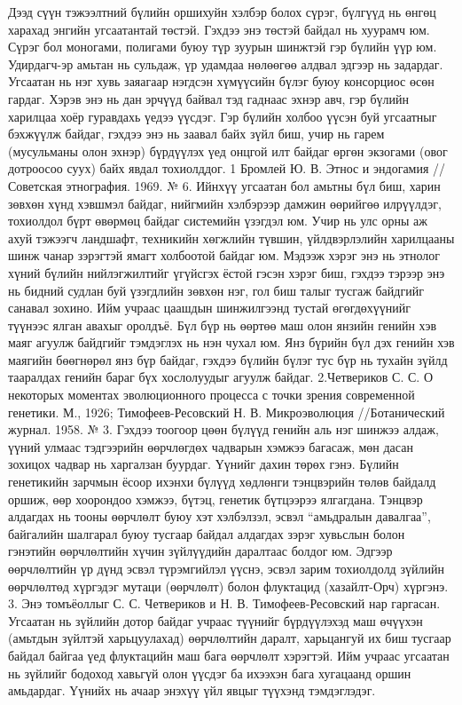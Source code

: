 Дээд сүүн тэжээлтний бүлийн оршихуйн хэлбэр болох сүрэг, бүлгүүд нь өнгөц харахад энгийн угсаатантай төстэй. Гэхдээ энэ төстэй байдал нь хуурамч юм. Сүрэг бол моногами, полигами буюу түр зуурын шинжтэй гэр бүлийн үүр юм. Удирдагч-эр амьтан нь сульдаж, үр удамдаа нөлөөгөө алдвал эдгээр нь задардаг. Угсаатан нь нэг хувь заяагаар нэгдсэн хүмүүсийн бүлэг буюу консорциос өсөн гардаг. Хэрэв энэ нь дан эрчүүд байвал тэд гаднаас эхнэр авч, гэр бүлийн харилцаа хоёр гуравдахь үедээ үүсдэг. Гэр бүлийн холбоо үүсэн буй угсаатныг бэхжүүлж байдаг, гэхдээ энэ нь заавал байх зүйл биш, учир нь гарем (мусульманы олон эхнэр) бүрдүүлэх үед онцгой илт байдаг өргөн экзогами (овог дотроосоо суух) байх явдал тохиолддог. 1 Бромлей Ю. В. Этнос и эндогамия //Советская этнография. 1969. № 6.
Ийнхүү угсаатан бол амьтны бүл биш, харин зөвхөн хүнд хэвшмэл байдаг, нийгмийн хэлбэрээр дамжин өөрийгөө илрүүлдэг, тохиолдол бүрт өвөрмөц байдаг системийн үзэгдэл юм. Учир нь улс орны аж ахуй тэжээгч ландшафт, техникийн хөгжлийн түвшин, үйлдвэрлэлийн харилцааны шинж чанар зэрэгтэй ямагт холбоотой байдаг юм. Мэдээж хэрэг энэ нь этнолог хүний бүлийн нийлэгжилтийг үгүйсгэх ёстой гэсэн хэрэг биш, гэхдээ тэрээр энэ нь бидний судлан буй үзэгдлийн зөвхөн нэг, гол биш талыг тусгаж байдгийг санавал зохино. Ийм учраас цаашдын шинжилгээнд тустай өгөгдөхүүнийг түүнээс ялган авахыг оролдъё.
Бүл бүр нь өөртөө маш олон янзийн генийн хэв маяг агуулж байдгийг тэмдэглэх нь нэн чухал юм. Янз бүрийн бүл дэх генийн хэв маягийн бөөгнөрөл янз бүр байдаг, гэхдээ бүлийн бүлэг тус бүр нь тухайн зүйлд тааралдах генийн бараг бүх хослолуудыг агуулж байдаг. 2.Четвериков С. С. О некоторых моментах эволюционного процесса с точки зрения современной генетики. М., 1926; Тимофеев-Ресовский Н. В. Микроэволюция //Ботанический журнал. 1958. № 3.
Гэхдээ тоогоор цөөн бүлүүд генийн аль нэг шинжээ алдаж, үүний улмаас тэдгээрийн өөрчлөгдөх чадварын хэмжээ багасаж, мөн дасан зохицох чадвар нь харгалзан буурдаг. Үүнийг дахин төрөх гэнэ. Бүлийн генетикийн зарчмын ёсоор ихэнхи бүлүүд хөдлөнги тэнцвэрийн төлөв байдалд оршиж, өөр хоорондоо хэмжээ, бүтэц, генетик бүтцээрээ ялгагдана. Тэнцвэр алдагдах нь тооны өөрчлөлт буюу хэт хэлбэлзэл, эсвэл “амьдралын давалгаа”, байгалийн шалгарал буюу тусгаар байдал алдагдах зэрэг хувьслын болон гэнэтийн өөрчлөлтийн хүчин зүйлүүдийн даралтаас болдог юм. Эдгээр өөрчлөлтийн үр дүнд эсвэл түрэмгийлэл үүснэ, эсвэл зарим тохиолдолд зүйлийн өөрчлөлтөд хүргэдэг мутаци (өөрчлөлт) болон флуктацид (хазайлт-Орч) хүргэнэ. 3. Энэ томъёоллыг С. С. Четвериков и Н. В. Тимофеев-Ресовский нар гаргасан.
Угсаатан нь зүйлийн дотор байдаг учраас түүнийг бүрдүүлэхэд маш өчүүхэн (амьтдын зүйлтэй харьцуулахад) өөрчлөлтийн даралт, харьцангуй их биш тусгаар байдал байгаа үед флуктацийн маш бага өөрчлөлт хэрэгтэй. Ийм учраас угсаатан нь зүйлийг бодоход хавьгүй олон үүсдэг ба ихээхэн бага хугацаанд оршин амьдардаг. Үүнийх нь ачаар энэхүү үйл явцыг түүхэнд тэмдэглэдэг.
